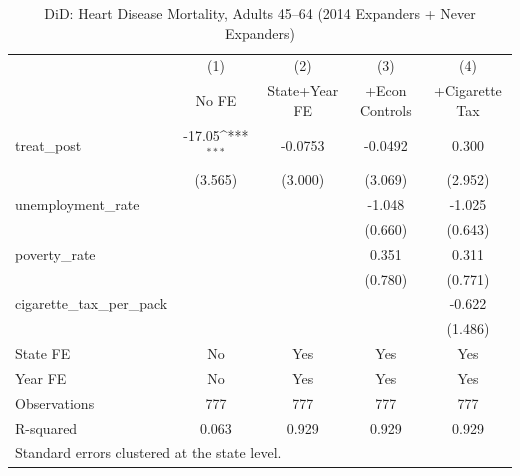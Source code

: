 \begin{table}[htbp]\centering
\def\sym#1{\ifmmode^{#1}\else\(^{#1}\)\fi}
\caption{DiD: Heart Disease Mortality, Adults 45--64 (2014 Expanders + Never Expanders)}
\begin{tabular}{l*{4}{c}}
\toprule
                    &\multicolumn{1}{c}{(1)}&\multicolumn{1}{c}{(2)}&\multicolumn{1}{c}{(3)}&\multicolumn{1}{c}{(4)}\\
                    &\multicolumn{1}{c}{No FE}&\multicolumn{1}{c}{State+Year FE}&\multicolumn{1}{c}{+Econ Controls}&\multicolumn{1}{c}{+Cigarette Tax}\\
\midrule
treat\_post          &      -17.05\sym{***}&     -0.0753         &     -0.0492         &       0.300         \\
                    &     (3.565)         &     (3.000)         &     (3.069)         &     (2.952)         \\
\addlinespace
unemployment\_rate   &                     &                     &      -1.048         &      -1.025         \\
                    &                     &                     &     (0.660)         &     (0.643)         \\
\addlinespace
poverty\_rate        &                     &                     &       0.351         &       0.311         \\
                    &                     &                     &     (0.780)         &     (0.771)         \\
\addlinespace
cigarette\_tax\_per\_pack&                     &                     &                     &      -0.622         \\
                    &                     &                     &                     &     (1.486)         \\
\midrule
State FE            &          No         &         Yes         &         Yes         &         Yes         \\
Year FE             &          No         &         Yes         &         Yes         &         Yes         \\
Observations        &         777         &         777         &         777         &         777         \\
R-squared           &       0.063         &       0.929         &       0.929         &       0.929         \\
\bottomrule
\multicolumn{5}{l}{\footnotesize Standard errors clustered at the state level.}\\
\end{tabular}
\end{table}
